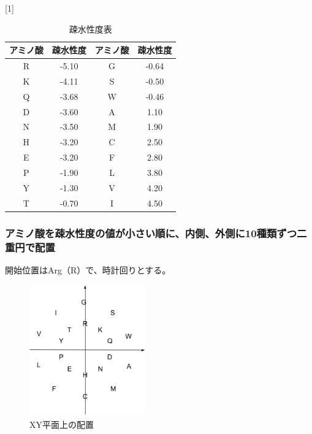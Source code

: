\documentclass[a4paper,12pt]{jsreport}
\begin{document}
\begin{table}[H]
\centering
\caption{疎水性度表}
\scalebox{1}[1]{
\begin{tabular}{|cc|cc|} \hline
アミノ酸 & 疎水性度 & アミノ酸 & 疎水性度 \\ \hline
R & -5.10 &G & -0.64 \\[-2mm]
K & -4.11 &S & -0.50 \\[-2mm]
Q & -3.68 &W & -0.46 \\[-2mm]
D & -3.60 &A & 1.10 \\[-2mm]
N & -3.50 &M & 1.90 \\[-2mm]
H & -3.20 &C & 2.50 \\[-2mm]
E & -3.20 &F & 2.80 \\[-2mm]
P & -1.90 &L & 3.80 \\[-2mm]
Y & -1.30 &V & 4.20 \\[-2mm]
T & -0.70 &I & 4.50 \\ \hline
\end{tabular}
}
\end{table}


\subsubsection{アミノ酸を疎水性度の値が小さい順に、内側、外側に10種類ずつ二重円で配置}
開始位置はArg（R）で、時計回りとする。


\begin{figure}[H]
\centering
\includegraphics[width=50mm]{pic01.png}
\caption{XY平面上の配置}
\end{figure}
\end{document}
